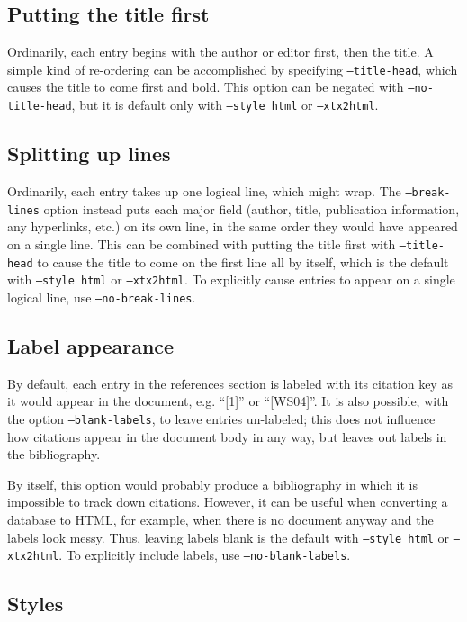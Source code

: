 \documentclass{article}
\begin{document}
\subsection{Putting the title first}

Ordinarily, each entry begins with the author or editor first, then the
title.  A simple kind of re-ordering can be accomplished by specifying
\texttt{--title-head}, which causes the title to come first and bold.
This option can be negated with \texttt{--no-title-head}, but it is
default only with \texttt{--style~html} or \texttt{--xtx2html}.

\subsection{Splitting up lines}

Ordinarily, each entry takes up one logical line, which might wrap.
The \texttt{--break-lines} option instead puts each major field (author,
title, publication information, any hyperlinks, etc.) on its own line,
in the same order they would have appeared on a single line.  This can be
combined with putting the title first with \texttt{--title-head} to cause
the title to come on the first line all by itself, which is the default
with \texttt{--style~html} or \texttt{--xtx2html}.  To explicitly cause
entries to appear on a single logical line, use \texttt{--no-break-lines}.

\subsection{Label appearance}

By default, each entry in the references section is labeled with
its citation key as it would appear in the document, e.g. ``[1]'' or
``[WS04]''.  It is also possible, with the option \texttt{--blank-labels},
to leave entries un-labeled; this does not influence how citations
appear in the document body in any way, but leaves out labels in the
bibliography.

By itself, this option would probably produce a bibliography in which it
is impossible to track down citations.  However, it can be useful when
converting a database to HTML, for example, when there is no document
anyway and the labels look messy.  Thus, leaving labels blank is the
default with \texttt{--style~html} or \texttt{--xtx2html}.  To explicitly
include labels, use \texttt{--no-blank-labels}.

\subsection{Styles}
\end{document}
